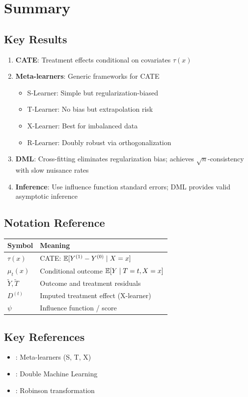 \section{Summary}
\label{sec:cate_summary}

\subsection{Key Results}

\begin{enumerate}
    \item \textbf{CATE}: Treatment effects conditional on covariates $\tau(x)$

    \item \textbf{Meta-learners}: Generic frameworks for CATE
    \begin{itemize}
        \item S-Learner: Simple but regularization-biased
        \item T-Learner: No bias but extrapolation risk
        \item X-Learner: Best for imbalanced data
        \item R-Learner: Doubly robust via orthogonalization
    \end{itemize}

    \item \textbf{DML}: Cross-fitting eliminates regularization bias; achieves $\sqrt{n}$-consistency with slow nuisance rates

    \item \textbf{Inference}: Use influence function standard errors; DML provides valid asymptotic inference
\end{enumerate}

\subsection{Notation Reference}

\begin{center}
\begin{tabular}{ll}
\toprule
Symbol & Meaning \\
\midrule
$\tau(x)$ & CATE: $\mathbb{E}[Y^{(1)} - Y^{(0)} \mid X = x]$ \\
$\mu_t(x)$ & Conditional outcome $\mathbb{E}[Y \mid T=t, X=x]$ \\
$\tilde{Y}, \tilde{T}$ & Outcome and treatment residuals \\
$D^{(t)}$ & Imputed treatment effect (X-learner) \\
$\psi$ & Influence function / score \\
\bottomrule
\end{tabular}
\end{center}

\subsection{Key References}

\begin{itemize}
    \item \cite{kunzel2019metalearners}: Meta-learners (S, T, X)
    \item \cite{chernozhukov2018dml}: Double Machine Learning
    \item \cite{robinson1988root}: Robinson transformation
\end{itemize}
